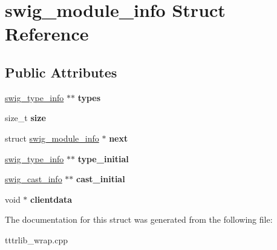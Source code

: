 \hypertarget{structswig__module__info}{}\section{swig\+\_\+module\+\_\+info Struct Reference}
\label{structswig__module__info}
\subsection*{Public Attributes}
\begin{DoxyCompactItemize}
\item 
\mbox{\label{structswig__module__info_ad658c7738e9a035ef8eea865322fbf13}} 
\hyperlink{structswig__type__info}{swig\+\_\+type\+\_\+info} $\ast$$\ast$ {\bfseries types}
\item 
\mbox{\label{structswig__module__info_aaf8907cf8509ee0464af8c9dfd909042}} 
size\+\_\+t {\bfseries size}
\item 
\mbox{\label{structswig__module__info_ac177d150b85ab77122089acf1f06d9c6}} 
struct \hyperlink{structswig__module__info}{swig\+\_\+module\+\_\+info} $\ast$ {\bfseries next}
\item 
\mbox{\label{structswig__module__info_a76c7d5b0fc10371748616d0b6c815a17}} 
\hyperlink{structswig__type__info}{swig\+\_\+type\+\_\+info} $\ast$$\ast$ {\bfseries type\+\_\+initial}
\item 
\mbox{\label{structswig__module__info_a15f6b50a41f144afb1148fc412dc01f7}} 
\hyperlink{structswig__cast__info}{swig\+\_\+cast\+\_\+info} $\ast$$\ast$ {\bfseries cast\+\_\+initial}
\item 
\mbox{\label{structswig__module__info_a9fb6e461fcaf14c209049adfae4e9754}} 
void $\ast$ {\bfseries clientdata}
\end{DoxyCompactItemize}


The documentation for this struct was generated from the following file\+:\begin{DoxyCompactItemize}
\item 
tttrlib\+\_\+wrap.\+cpp\end{DoxyCompactItemize}
